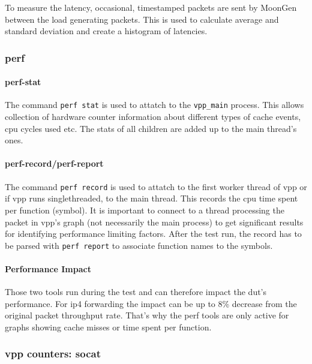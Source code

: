 To measure the latency, occasional, timestamped packets are sent by
MoonGen between the load generating packets. This is used to calculate
average and standard deviation and create a histogram of latencies.


\subsubsection{\Ac{perf}}

\paragraph{perf-stat} 

The command \lstinline|perf stat| is used to attatch to the
\lstinline|vpp_main| process. This allows collection of hardware
counter information about different types of cache events, cpu cycles
used etc. The stats of all children are added up to the main thread's
ones.

\paragraph{perf-record/perf-report}
\label{sec:perf}

The command \lstinline|perf record| is used to attatch to the first
worker thread of \Ac{vpp} or if vpp runs singlethreaded, to the main
thread. This records the cpu time spent per function (symbol). It is
important to connect to a thread processing the packet in \Ac{vpp}'s
graph (not necessarily the main process) to get significant results
for identifying performance limiting factors. After the test run, the
record has to be parsed with \lstinline|perf report| to associate
function names to the symbols.

\paragraph{Performance Impact}

Those two tools run during the test and can therefore impact the
\Ac{dut}'s performance. For \Ac{ip4} forwarding the impact can be up
to 8\% decrease from the original packet throughput rate. That's why
the \Ac{perf} tools are only active for graphs showing cache misses or
time spent per function. 


\subsubsection{vpp counters: socat}
\label{sec:vppcounters}

